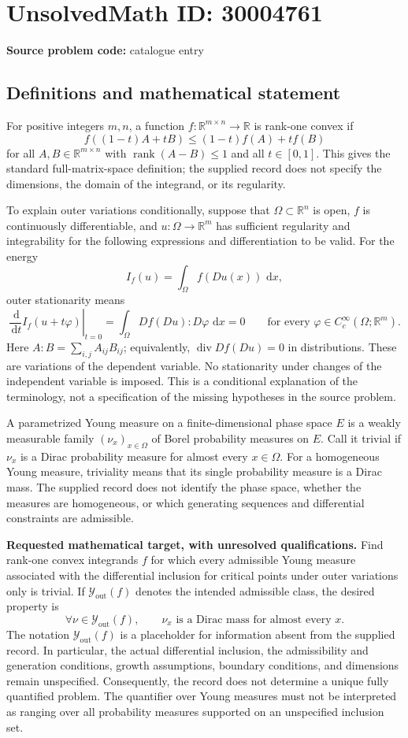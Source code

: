 \documentclass[11pt]{article}
\newcommand{\R}{\mathbb{R}}
\newcommand{\dd}{\,\mathrm{d}}
\begin{document}
\section*{UnsolvedMath ID: 30004761}
\textbf{Source problem code:} catalogue entry
\subsection{Definitions and mathematical statement}
For positive integers \(m,n\), a function \(f\colon\R^{m\times n}\to\R\) is rank-one convex if
\[
f((1-t)A+tB)\leq (1-t)f(A)+tf(B)
\]
for all \(A,B\in\R^{m\times n}\) with \(\operatorname{rank}(A-B)\leq1\) and all \(t\in[0,1]\). This gives the standard full-matrix-space definition; the supplied record does not specify the dimensions, the domain of the integrand, or its regularity.

To explain outer variations conditionally, suppose that \(\Omega\subset\R^n\) is open, \(f\) is continuously differentiable, and \(u\colon\Omega\to\R^m\) has sufficient regularity and integrability for the following expressions and differentiation to be valid. For the energy
\[
I_f(u)=\int_\Omega f(Du(x))\,\dd x,
\]
outer stationarity means
\[
\left.\frac{\dd}{\dd t}I_f(u+t\varphi)\right|_{t=0}
=\int_\Omega Df(Du):D\varphi\,\dd x=0
\qquad\text{for every }\varphi\in C_c^\infty(\Omega;\R^m).
\]
Here \(A:B=\sum_{i,j}A_{ij}B_{ij}\); equivalently, \(\operatorname{div}Df(Du)=0\) in distributions. These are variations of the dependent variable. No stationarity under changes of the independent variable is imposed. This is a conditional explanation of the terminology, not a specification of the missing hypotheses in the source problem.

A parametrized Young measure on a finite-dimensional phase space \(E\) is a weakly measurable family \((\nu_x)_{x\in\Omega}\) of Borel probability measures on \(E\). Call it trivial if \(\nu_x\) is a Dirac probability measure for almost every \(x\in\Omega\). For a homogeneous Young measure, triviality means that its single probability measure is a Dirac mass. The supplied record does not identify the phase space, whether the measures are homogeneous, or which generating sequences and differential constraints are admissible.

\textbf{Requested mathematical target, with unresolved qualifications.} Find rank-one convex integrands \(f\) for which every admissible Young measure associated with the differential inclusion for critical points under outer variations only is trivial. If \(\mathcal Y_{\mathrm{out}}(f)\) denotes the intended admissible class, the desired property is
\[
\forall\nu\in\mathcal Y_{\mathrm{out}}(f),\qquad
\nu_x\text{ is a Dirac mass for almost every }x.
\]
The notation \(\mathcal Y_{\mathrm{out}}(f)\) is a placeholder for information absent from the supplied record. In particular, the actual differential inclusion, the admissibility and generation conditions, growth assumptions, boundary conditions, and dimensions remain unspecified. Consequently, the record does not determine a unique fully quantified problem. The quantifier over Young measures must not be interpreted as ranging over all probability measures supported on an unspecified inclusion set.
\end{document}

